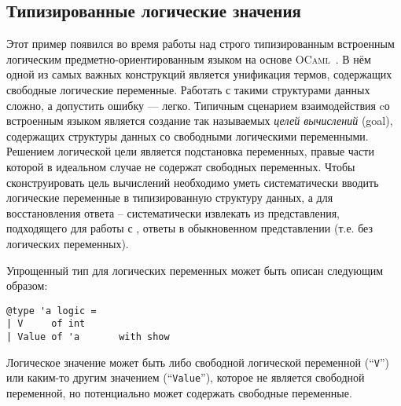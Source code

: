 


\subsection{Типизированные логические значения}
\label{sec:lists}

Этот пример появился во время работы над строго типизированным встроенным логическим предметно-ориентированным языком на основе \textsc{OCaml}~\cite{OCanren}. 
В нём одной из самых важных конструкций является унификация термов, содержащих свободные логические переменные. Работать с такими структурами данных сложно, а допустить ошибку --- легко. 
Типичным сценарием взаимодействия  
cо встроенным языком 
является 
создание так называемых \emph{целей вычислений} (goal), содержащих структуры данных со свободными логическими переменными.
Решением логической цели является подстановка переменных, правые части которой в идеальном случае не содержат свободных переменных. 
Чтобы сконструировать цель вычислений необходимо уметь систематически вводить логические переменные в типизированную структуру данных,  а для восстановления ответа -- систематически извлекать из представления, подходящего для работы с \OCanren{}, ответы в обыкновенном
представлении (т.е. без логических переменных).

Упрощенный тип для логических переменных может быть описан следующим образом:

\begin{lstlisting}
@type 'a logic =
| V     of int
| Value of 'a       with show
\end{lstlisting}
Логическое значение может быть либо свободной логической переменной (``\lstinline{V}'') или каким-то другим значением (``\lstinline{Value}''), которое не является свободной переменной, но потенциально может содержать свободные переменные.
\begin{comment}

Чтобы преобразовывать в и из логических значений, можно воспользоваться следующими функциями:

\begin{lstlisting}
let lift x = Value x

let reify  = function
| V     _ -> invalid_arg "Free variable"
| Value x -> x
\end{lstlisting}

Функция ``\lstinline{reify}'' бросает исключение для свободных переменных, так как в присутствии вхождений свободных переменных
логическое значение нельзя рассматривать как обыкновенную (нелогическую) структуру данных.
\end{comment}


